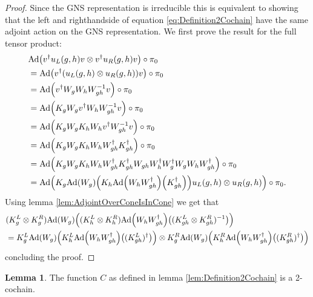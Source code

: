 \documentclass[12pt,a4paper,twoside]{article}
\let\originalleft\left
\let\originalright\right
\renewcommand{\left}{\mathopen{}\mathclose\bgroup\originalleft}
\renewcommand{\right}{\aftergroup\egroup\originalright}
\newcommand{\Ad}[1]{\textrm{Ad}\left(#1\right)}
\theoremstyle{definition}
\newtheorem{lemma}[theorem]{Lemma}
\numberwithin{equation}{section}
\begin{document}
\begin{proof}
	Since the GNS representation is irreducible this is equivalent to showing that the left and righthandside of equation \eqref{eq:Definition2Cochain} have the same adjoint action on the GNS representation. We first prove the result for the full tensor product:
	\begin{align}
		&\Ad{v^\dagger u_L(g,h)v\otimes v^\dagger u_R(g,h) v}\circ\pi_0\\
		&=\Ad{v^\dagger (u_L(g,h)\otimes u_R(g,h)) v}\circ\pi_0\\
		&=\Ad{v^\dagger W_g W_h W_{gh}^{-1}v}\circ\pi_0\\
		&=\Ad{K_gW_g v^\dagger W_h W_{gh}^{-1}v}\circ\pi_0\\
		&=\Ad{K_gW_g K_h W_h v^\dagger W_{gh}^{-1}v}\circ\pi_0\\
		&=\Ad{K_gW_g K_h W_h W_{gh}^\dagger K_{gh}^\dagger }\circ\pi_0\\
		&=\Ad{K_gW_g K_h W_h W_{gh}^\dagger K_{gh}^\dagger W_{gh}W_h^\dagger W_g^\dagger W_gW_hW_{gh}^\dagger}\circ\pi_0\\
		&=\Ad{K_g\Ad{W_g}\left(K_h\Ad{W_hW_{gh}^\dagger}\left(K_{gh}^\dagger\right)\right)u_L(g,h)\otimes u_
			R(g,h)}\circ\pi_0.
	\end{align}
	Using lemma \ref{lem:AdjointOverConeIsInCone} we get that
	\begin{align}
		&(K_g^L\otimes K_g^R)\Ad{W_g}\left((K_h^L\otimes K_h^R)\Ad{W_hW_{gh}^\dagger}\left((K_{gh}^L\otimes K_{gh}^R)^{-1}\right)\right)\\
		&=K_g^L\Ad{W_g}\left(K_h^L\Ad{W_hW_{gh}^\dagger}\left((K_{gh}^L)^\dagger\right)\right)\otimes K_g^R\Ad{W_g}\left(K_h^R\Ad{W_hW_{gh}^\dagger}\left((K_{gh}^R)^\dagger\right)\right)
	\end{align}
	concluding the proof.
\end{proof}
\begin{lemma}
	The function $C$ as defined in lemma \ref{lem:Definition2Cochain} is a 2-cochain.
\end{lemma}
\end{document}
